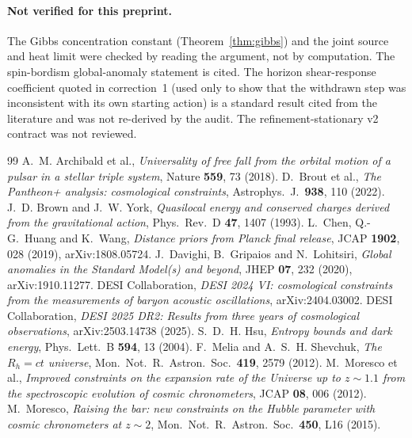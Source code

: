\documentclass[11pt]{article}
\theoremstyle{definition}
\theoremstyle{remark}
\begin{document}
\paragraph{Not verified for this preprint.} The Gibbs concentration constant
(Theorem~\ref{thm:gibbs}) and the joint source and heat limit were checked by reading the
argument, not by computation. The spin-bordism global-anomaly statement is cited. The
horizon shear-response coefficient quoted in correction~1 (used only to show that the
withdrawn step was inconsistent with its own starting action) is a standard result cited
from the literature and was not re-derived by the audit. The refinement-stationary v2 contract
was not reviewed.

\begin{thebibliography}{99}\footnotesize\setlength{\itemsep}{0pt}
 A.~M. Archibald et al., \emph{Universality of free fall from the
orbital motion of a pulsar in a stellar triple system}, Nature \textbf{559}, 73 (2018).
 D.~Brout et al., \emph{The Pantheon+ analysis: cosmological
constraints}, Astrophys.\ J.\ \textbf{938}, 110 (2022).
 J.~D. Brown and J.~W. York, \emph{Quasilocal energy and conserved
charges derived from the gravitational action}, Phys.\ Rev.\ D \textbf{47}, 1407 (1993).
 L.~Chen, Q.-G.~Huang and K.~Wang, \emph{Distance priors from Planck final release}, JCAP \textbf{1902}, 028 (2019), arXiv:1808.05724.
 J.~Davighi, B.~Gripaios and N.~Lohitsiri, \emph{Global anomalies in
the Standard Model(s) and beyond}, JHEP \textbf{07}, 232 (2020), arXiv:1910.11277.
 DESI Collaboration, \emph{DESI 2024 VI: cosmological constraints from
the measurements of baryon acoustic oscillations}, arXiv:2404.03002.
 DESI Collaboration, \emph{DESI 2025 DR2: Results from three years of cosmological observations}, arXiv:2503.14738 (2025).
 S.~D.~H. Hsu, \emph{Entropy bounds and dark energy}, Phys.\ Lett.\ B
\textbf{594}, 13 (2004).
 F.~Melia and A.~S.~H. Shevchuk, \emph{The $R_h=ct$ universe}, Mon.\
Not.\ R.\ Astron.\ Soc.\ \textbf{419}, 2579 (2012).
 M.~Moresco et al., \emph{Improved constraints on the expansion rate
of the Universe up to $z\sim1.1$ from the spectroscopic evolution of cosmic chronometers},
JCAP \textbf{08}, 006 (2012).
 M.~Moresco, \emph{Raising the bar: new constraints on the Hubble
parameter with cosmic chronometers at $z\sim2$}, Mon.\ Not.\ R.\ Astron.\ Soc.\
\textbf{450}, L16 (2015).

\end{thebibliography}
\end{document}
